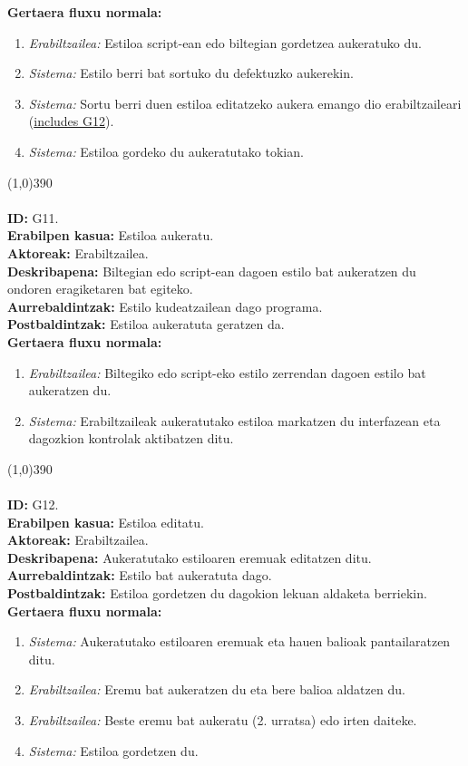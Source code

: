 \textbf{Gertaera fluxu normala:}
\begin{enumerate}
	\item \textit{Erabiltzailea:} Estiloa script-ean edo biltegian gordetzea aukeratuko du.
	\item \textit{Sistema:} Estilo berri bat sortuko du defektuzko aukerekin.
	\item \textit{Sistema:} Sortu berri duen estiloa editatzeko aukera emango dio erabiltzaileari (\underline{includes G12}).
	\item \textit{Sistema:} Estiloa gordeko du aukeratutako tokian.
\end{enumerate}
\line(1,0){390}\\
\noindent\\
\textbf{ID:} G11.\\
\textbf{Erabilpen kasua:} Estiloa aukeratu.\\
\textbf{Aktoreak:} Erabiltzailea.\\
\textbf{Deskribapena:} Biltegian edo script-ean dagoen estilo bat aukeratzen du ondoren eragiketaren bat egiteko.\\
\textbf{Aurrebaldintzak:} Estilo kudeatzailean dago programa.\\
\textbf{Postbaldintzak:} Estiloa aukeratuta geratzen da.\\
\textbf{Gertaera fluxu normala:}
\begin{enumerate}
	\item \textit{Erabiltzailea:} Biltegiko edo script-eko estilo zerrendan dagoen estilo bat aukeratzen du.
	\item \textit{Sistema:} Erabiltzaileak aukeratutako estiloa markatzen du interfazean eta dagozkion kontrolak aktibatzen ditu.
\end{enumerate}
\line(1,0){390}\\
\noindent\\
\textbf{ID:} G12.\\
\textbf{Erabilpen kasua:} Estiloa editatu.\\
\textbf{Aktoreak:} Erabiltzailea.\\
\textbf{Deskribapena:} Aukeratutako estiloaren eremuak editatzen ditu.\\
\textbf{Aurrebaldintzak:} Estilo bat aukeratuta dago.\\
\textbf{Postbaldintzak:} Estiloa gordetzen du dagokion lekuan aldaketa berriekin.\\
\textbf{Gertaera fluxu normala:}
\begin{enumerate}
	\item \textit{Sistema:} Aukeratutako estiloaren eremuak eta hauen balioak pantailaratzen ditu.
	\item \textit{Erabiltzailea:} Eremu bat aukeratzen du eta bere balioa aldatzen du.
	\item \textit{Erabiltzailea:} Beste eremu bat aukeratu (2. urratsa) edo irten daiteke.
	\item \textit{Sistema:} Estiloa gordetzen du.
\end{enumerate}
